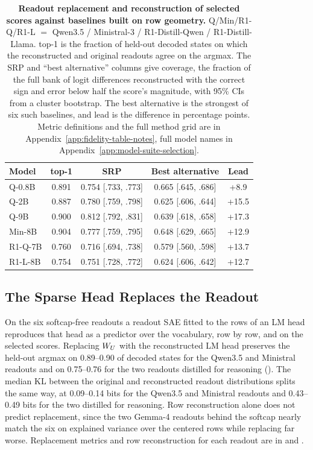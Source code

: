 \begin{table}[t]
\caption{\textbf{Readout replacement and reconstruction of selected scores
against baselines built on row geometry.}
Q/Min/R1-Q/R1-L \(=\) Qwen3.5 / Ministral-3 /
R1-Distill-Qwen / R1-Distill-Llama.
top-1 is the fraction of held-out decoded states on which the reconstructed and
original readouts agree on the argmax. The SRP and ``best alternative''
columns give coverage, the fraction of the full bank of logit differences
reconstructed with the correct sign and error below half the score's
magnitude, with 95\% CIs from a cluster bootstrap. The best alternative
is the strongest of six such baselines, and lead is the difference in
percentage points.
Metric definitions and the full method grid are in
Appendix~\ref{app:fidelity-table-notes}, full model names in
Appendix~\ref{app:model-suite-selection}.}
\label{tab:readout-score-fidelity-summary}
\centering
\scriptsize
\setlength{\tabcolsep}{2.0pt}
\renewcommand{\arraystretch}{1.06}
\begin{tabular*}{\linewidth}{@{\extracolsep{\fill}}lcccc@{}}
\toprule
Model & top-1 & SRP & Best alternative & Lead \\
\midrule
Q-0.8B & 0.891 & 0.754 [.733, .773] & 0.665 [.645, .686] & +8.9 \\
Q-2B   & 0.887 & 0.780 [.759, .798] & 0.625 [.606, .644] & +15.5 \\
Q-9B   & 0.900 & 0.812 [.792, .831] & 0.639 [.618, .658] & +17.3 \\
Min-8B & 0.904 & 0.777 [.759, .795] & 0.648 [.629, .665] & +12.9 \\
R1-Q-7B & 0.760 & 0.716 [.694, .738] & 0.579 [.560, .598] & +13.7 \\
R1-L-8B & 0.754 & 0.751 [.728, .772] & 0.624 [.606, .642] & +12.7 \\
\bottomrule
\end{tabular*}
\end{table}

\subsection{The Sparse Head Replaces the Readout}\label{subsec:readout-replacement-fidelity}
On the six softcap-free readouts a readout SAE fitted to the rows of an LM
head reproduces that head as a predictor over the vocabulary, row by
row, and on the selected scores.
Replacing \(W_U\) with the reconstructed LM head preserves the held-out
argmax on 0.89--0.90 of decoded states for the Qwen3.5 and Ministral
readouts and on 0.75--0.76 for the two readouts distilled for reasoning
(). The median KL between the
original and reconstructed readout distributions splits the same way, at
0.09--0.14 bits for the Qwen3.5 and Ministral readouts and 0.43--0.49
bits for the two distilled for reasoning. Row reconstruction alone does not predict
replacement, since the two Gemma-4 readouts behind the softcap nearly match
the six on explained variance over the centered rows while replacing
far worse. Replacement metrics and row reconstruction for each
readout are in
 and
.

